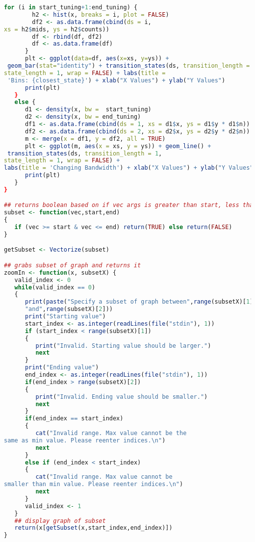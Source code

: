\documentclass{article}
\begin{document}
\begin{lstlisting}[frame=single,language=R,showstringspaces=false]
      for (i in start_tuning+1:end_tuning) {
        h2 <- hist(x, breaks = i, plot = FALSE)
        df2 <- as.data.frame(cbind(ds = i, 
xs = h2$mids, ys = h2$counts))
        df <- rbind(df, df2)
        df <- as.data.frame(df)
      }
      plt <- ggplot(data=df, aes(x=xs, y=ys)) +
 geom_bar(stat="identity") + transition_states(ds, transition_length = 1, 
state_length = 1, wrap = FALSE) + labs(title =
 'Bins: {closest_state}') + xlab("X Values") + ylab("Y Values")
      print(plt)
   }
   else {
      d1 <- density(x, bw =  start_tuning)
      d2 <- density(x, bw = end_tuning)
      df1 <- as.data.frame(cbind(ds = 1, xs = d1$x, ys = d1$y * d1$n))
      df2 <- as.data.frame(cbind(ds = 2, xs = d2$x, ys = d2$y * d2$n))
      m <- merge(x = df1, y = df2, all = TRUE)
      plt <- ggplot(m, aes(x = xs, y = ys)) + geom_line() +
 transition_states(ds, transition_length = 1, 
state_length = 1, wrap = FALSE) + 
labs(title = 'Changing Bandwidth') + xlab("X Values") + ylab("Y Values")
      print(plt)
   }
}

## returns boolean based on if vec args is greater than start, less than end
subset <- function(vec,start,end)
{
   if (vec >= start & vec <= end) return(TRUE) else return(FALSE)
}

getSubset <- Vectorize(subset)

## grabs subset of graph and returns it
zoomIn <- function(x, subsetX) {
   valid_index <- 0
   while(valid_index == 0)
   {
      print(paste("Specify a subset of graph between",range(subsetX)[1],
      "and",range(subsetX)[2]))
      print("Starting value")
      start_index <- as.integer(readLines(file("stdin"), 1))
      if (start_index < range(subsetX)[1])
      {
         print("Invalid. Starting value should be larger.")
         next
      }
      print("Ending value")
      end_index <- as.integer(readLines(file("stdin"), 1))
      if(end_index > range(subsetX)[2])
      {
         print("Invalid. Ending value should be smaller.")
         next
      }
      if(end_index == start_index)
      {
         cat("Invalid range. Max value cannot be the 
same as min value. Please reenter indices.\n")
         next
      }
      else if (end_index < start_index)
      {
         cat("Invalid range. Max value cannot be 
smaller than min value. Please reenter indices.\n")
         next
      }
      valid_index <- 1
   }
   ## display graph of subset
   return(x[getSubset(x,start_index,end_index)])
}


\end{lstlisting}
\end{document}
